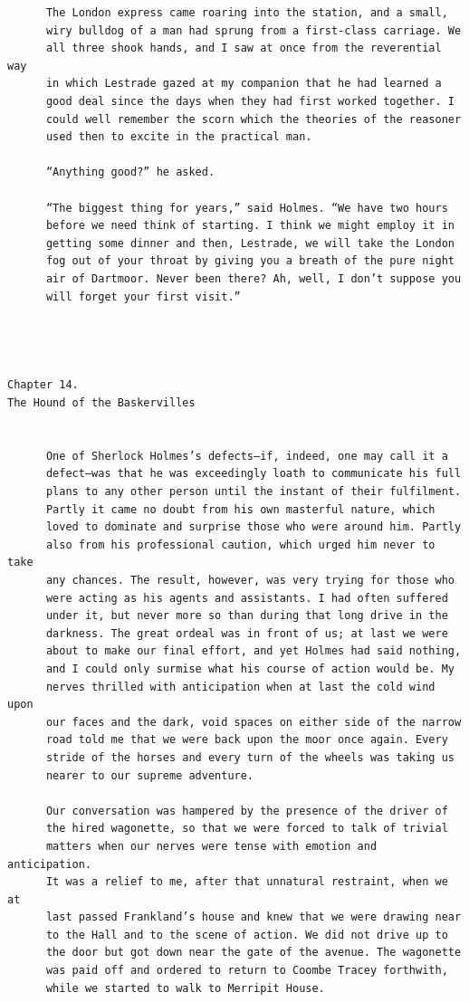 \documentclass{article}
\begin{document}
\begin{verbatim}
      The London express came roaring into the station, and a small,
      wiry bulldog of a man had sprung from a first-class carriage. We
      all three shook hands, and I saw at once from the reverential way
      in which Lestrade gazed at my companion that he had learned a
      good deal since the days when they had first worked together. I
      could well remember the scorn which the theories of the reasoner
      used then to excite in the practical man.

      “Anything good?” he asked.

      “The biggest thing for years,” said Holmes. “We have two hours
      before we need think of starting. I think we might employ it in
      getting some dinner and then, Lestrade, we will take the London
      fog out of your throat by giving you a breath of the pure night
      air of Dartmoor. Never been there? Ah, well, I don’t suppose you
      will forget your first visit.”




Chapter 14.
The Hound of the Baskervilles


      One of Sherlock Holmes’s defects—if, indeed, one may call it a
      defect—was that he was exceedingly loath to communicate his full
      plans to any other person until the instant of their fulfilment.
      Partly it came no doubt from his own masterful nature, which
      loved to dominate and surprise those who were around him. Partly
      also from his professional caution, which urged him never to take
      any chances. The result, however, was very trying for those who
      were acting as his agents and assistants. I had often suffered
      under it, but never more so than during that long drive in the
      darkness. The great ordeal was in front of us; at last we were
      about to make our final effort, and yet Holmes had said nothing,
      and I could only surmise what his course of action would be. My
      nerves thrilled with anticipation when at last the cold wind upon
      our faces and the dark, void spaces on either side of the narrow
      road told me that we were back upon the moor once again. Every
      stride of the horses and every turn of the wheels was taking us
      nearer to our supreme adventure.

      Our conversation was hampered by the presence of the driver of
      the hired wagonette, so that we were forced to talk of trivial
      matters when our nerves were tense with emotion and anticipation.
      It was a relief to me, after that unnatural restraint, when we at
      last passed Frankland’s house and knew that we were drawing near
      to the Hall and to the scene of action. We did not drive up to
      the door but got down near the gate of the avenue. The wagonette
      was paid off and ordered to return to Coombe Tracey forthwith,
      while we started to walk to Merripit House.


\end{verbatim}
\end{document}
